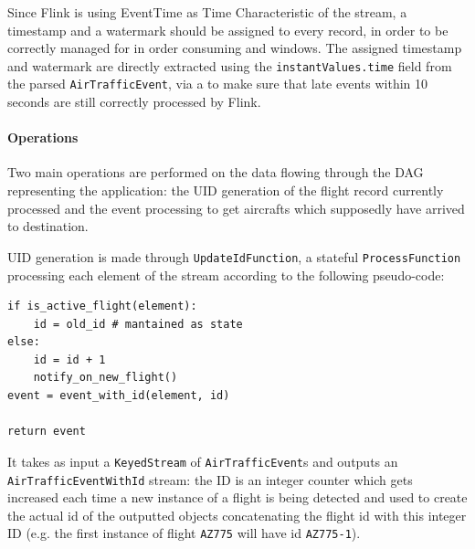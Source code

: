 Since Flink is using EventTime as Time Characteristic of the stream, a timestamp and a watermark should be assigned to every record, in order to be correctly managed for in order consuming and windows. The assigned timestamp and watermark are directly extracted using the \texttt{instantValues.time} field from the parsed \texttt{AirTrafficEvent}, via a  to make sure that late events within 10 seconds are still correctly processed by Flink.

\paragraph{Operations}

Two main operations are performed on the data flowing through the DAG representing the application: the UID generation of the flight record currently processed and the event processing to get aircrafts which supposedly have arrived to destination.

UID generation is made through \texttt{UpdateIdFunction}, a stateful \texttt{ProcessFunction} processing each element of the stream according to the following pseudo-code:

\begin{verbatim}
if is_active_flight(element):
    id = old_id # mantained as state
else:
    id = id + 1
    notify_on_new_flight()
event = event_with_id(element, id)

return event
\end{verbatim}

It takes as input a \texttt{KeyedStream} of \texttt{AirTrafficEvent}s and outputs an \texttt{AirTrafficEventWithId} stream: the ID is an integer counter which gets increased each time a new instance of a flight is being detected and used to create the actual id of the outputted objects concatenating the flight id with this integer ID (e.g. the first instance of flight \texttt{AZ775} will have id \texttt{AZ775-1}). 

